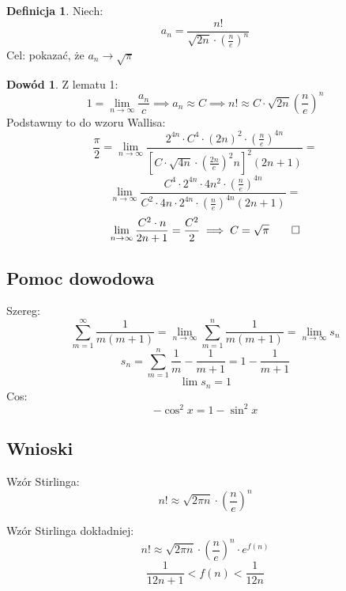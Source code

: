 \documentclass{article}
\theoremstyle{definition}
\newtheorem{de}{Definicja}[subsection]
\theoremstyle{definition}
\newtheorem{dd}{Dowód}[subsection]
\theoremstyle{definition}
\theoremstyle{definition}
\theoremstyle{definition}
\theoremstyle{definition}
\begin{document}
\begin{de}
    Niech:
    \[a_n = \frac{n!}{\sqrt{2n} \cdot \left(\frac{n}{e}\right)^n}\]
    Cel: pokazać, że $a_n \rightarrow \sqrt{\pi}$
\end{de}

\begin{dd}
    Z lematu 1:
    \[1 = \lim_{n\rightarrow \infty} \frac{a_n}{c} \implies a_n \approx C \implies n! \approx C\cdot \sqrt{2n} \left(\frac{n}{e}\right)^n\]
    Podstawmy to do wzoru Wallisa:
    \[\frac{\pi}{2} = \lim_{n\rightarrow \infty} \frac{2^{4n} \cdot C^4 \cdot (2n)^2 \cdot \left(\frac{n}{e}\right)^{4n}}{\left[C\cdot\sqrt{4n} \cdot \left(\frac{2n}{e}\right)^2n\right]^2 (2n+1)}=\]
    \[\lim_{n\rightarrow \infty} \frac{C^4 \cdot 2^{4n} \cdot 4n^2 \cdot \left(\frac{n}{e}\right)^{4n}}{C^2\cdot 4n \cdot 2^{4n} \cdot \left(\frac{n}{e}\right)^{4n} (2n+1)}=\]
    \[\lim_{n\rightarrow \infty} \frac{C^2\cdot n}{2n +1} = \frac{C^2}{2} \implies C=\sqrt{\pi}\qed\]
\end{dd}

\subsection{Pomoc dowodowa}

Szereg:
\[\sum_{m=1}^{\infty} \frac{1}{m(m+1)} = \lim_{n\rightarrow \infty} \sum_{m=1}^{n} \frac{1}{m(m+1)} = \lim_{n\rightarrow \infty} s_n\]
\[s_n = \sum_{m=1}^{n} \frac{1}{m} - \frac{1}{m+1} = 1 - \frac{1}{m+1}\]
\[\lim s_n = 1\]
Cos:
\[- \cos^2 x = 1 - \sin^2 x\]

\subsection{Wnioski}

Wzór Stirlinga:
\[n! \approx \sqrt{2\pi n} \cdot \left(\frac{n}{e}\right)^n\]

Wzór Stirlinga dokładniej:
\[n! \approx \sqrt{2\pi n} \cdot \left(\frac{n}{e}\right)^n \cdot e^{f(n)}\]
\[\frac{1}{12n+1} < f(n) < \frac{1}{12n}\]
\end{document}

